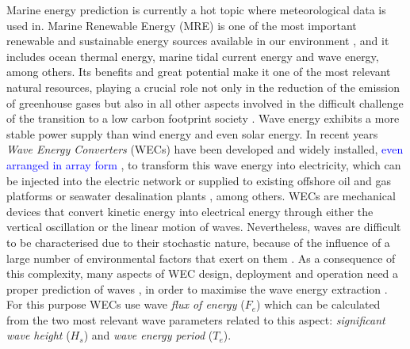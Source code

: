 \documentclass[energies,article,submit,moreauthors,pdftex]{Definitions/mdpi}
\begin{document}
		Marine energy prediction is currently a hot topic where meteorological data is used in. Marine Renewable Energy (MRE) is one of the most important renewable and sustainable energy sources available in our environment \cite{en12050787}, and it includes ocean thermal energy, marine tidal current energy and wave energy, among others. Its benefits and great potential \cite{ZEYRINGER20181281} make it one of the most relevant natural resources, playing a crucial role not only in the reduction of the emission of greenhouse gases but also in all other aspects involved in the difficult challenge of the transition to a low carbon footprint society \cite{en12091657, BREDE201344, Alizadeh2020a}. Wave energy exhibits a more stable power supply than wind energy and even solar energy. In recent years \textit{Wave Energy Converters} (WECs) \cite{FALCAO2010899} have been developed and widely installed, \textcolor{blue}{even arranged in array form \cite{Amini2020}}, to transform this wave energy into electricity, which can be injected into the electric network or supplied to existing offshore oil and gas platforms \cite{OLIVEIRAPINTO2019556} or seawater desalination plants \cite{FERNANDEZPRIETO2019546}, among others. WECs are mechanical devices that convert kinetic energy into electrical energy through either the vertical oscillation or the linear motion of waves. Nevertheless, waves are difficult to be characterised due to their stochastic nature, because of the influence of a large number of environmental factors that exert on them \cite{ochi1998}. As a consequence of this complexity, many aspects of WEC design, deployment and operation \cite{CROWLEY2018159, Abdelkhalik2016, 6898109} need a proper prediction of waves \cite{en11010011, Kaloop2020}, in order to maximise the wave energy extraction \cite{en80910370}. For this purpose WECs use wave \textit{flux of energy} ($F_e$) which can be calculated from the two most relevant wave parameters related to this aspect: \textit{significant wave height} ($H_s$) and \textit{wave energy period} ($T_e$).
		
\end{document}
